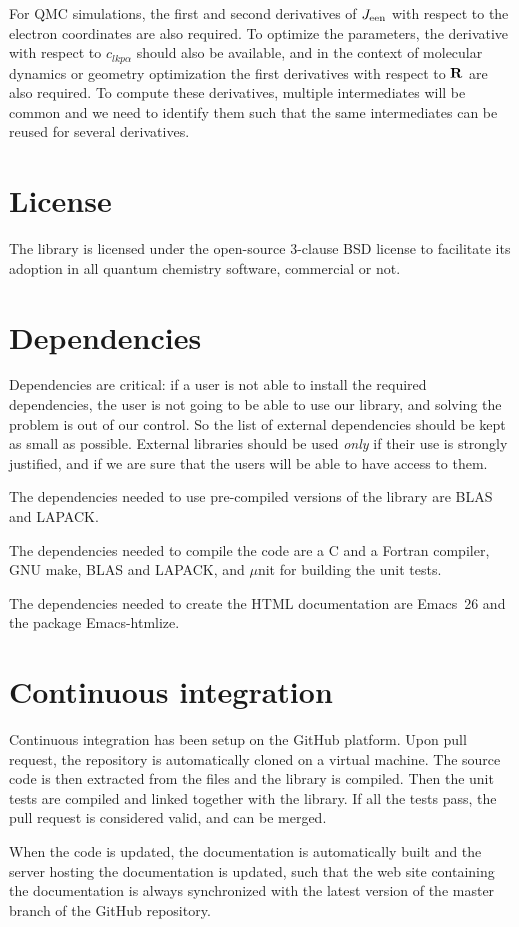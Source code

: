 For \ac{QMC} simulations, the first and second derivatives of $J_{\text{een}}$ with
respect to the electron coordinates are also required. To optimize the
parameters, the derivative with respect to $c_{lkp\alpha}$
should also be available, and in the context of molecular dynamics or
geometry optimization the first derivatives with respect to $\mathbf{R}$ are
also required. To compute these derivatives, multiple intermediates
will be common and we need to identify them such that the same
intermediates can be reused for several derivatives.


\section{License}

The library is licensed under the open-source 3-clause BSD license to facilitate
its adoption in all quantum chemistry software, commercial or not.

\section{Dependencies}

Dependencies are critical: if a user is not able to install the
required dependencies, the user is not going to be able to use our
library, and solving the problem is out of our control. So the list of
external dependencies should be kept as small as possible. 
External libraries should be used \emph{only} if their use is
strongly justified, and if we are sure that the users will be able to
have access to them.

The dependencies needed to use pre-compiled versions of the library
are \ac{BLAS} and \ac{LAPACK}.

The dependencies needed to compile the code are
a C and a Fortran compiler, GNU make, \ac{BLAS} and \ac{LAPACK}, and
$\mu$nit\cite{munit} for building the unit tests.

The dependencies needed to create the \ac{HTML} documentation are
Emacs~26 and the package Emacs-htmlize.


\section{Continuous integration}

Continuous integration has been setup on the GitHub platform. Upon
pull request, the repository is automatically cloned on a virtual
machine. The source code is then extracted from the {\orgmode}
files and the library is compiled. Then the unit tests are compiled
and linked together with the library. If all the tests pass, the
pull request is considered valid, and can be merged.

When the code is updated, the documentation is automatically built and
the server hosting the documentation is updated, such that the web
site containing the documentation is always synchronized with the
latest version of the master branch of the GitHub repository.
